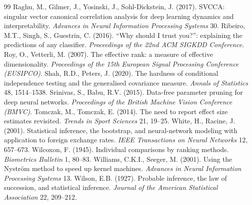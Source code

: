 \documentclass[11pt,a4paper]{article}
\theoremstyle{remark}\newtheorem{remark}{Remark}
\begin{document}
\begin{thebibliography}{99}
 Raghu, M., Gilmer, J., Yosinski, J., Sohl-Dickstein, J. (2017). SVCCA: singular vector canonical correlation analysis for deep learning dynamics and interpretability. \emph{Advances in Neural Information Processing Systems} 30.
 Ribeiro, M.T., Singh, S., Guestrin, C. (2016). ``Why should I trust you?'': explaining the predictions of any classifier. \emph{Proceedings of the 22nd ACM SIGKDD Conference}.
 Roy, O., Vetterli, M. (2007). The effective rank: a measure of effective dimensionality. \emph{Proceedings of the 15th European Signal Processing Conference (EUSIPCO)}.
 Shah, R.D., Peters, J. (2020). The hardness of conditional independence testing and the generalised covariance measure. \emph{Annals of Statistics} 48, 1514--1538.
 Srinivas, S., Babu, R.V. (2015). Data-free parameter pruning for deep neural networks. \emph{Proceedings of the British Machine Vision Conference (BMVC)}.
 Tomczak, M., Tomczak, E. (2014). The need to report effect size estimates revisited. \emph{Trends in Sport Sciences} 21, 19--25.
 White, H., Racine, J. (2001). Statistical inference, the bootstrap, and neural-network modeling with application to foreign exchange rates. \emph{IEEE Transactions on Neural Networks} 12, 657--673.
 Wilcoxon, F. (1945). Individual comparisons by ranking methods. \emph{Biometrics Bulletin} 1, 80--83.
 Williams, C.K.I., Seeger, M. (2001). Using the Nystr\"om method to speed up kernel machines. \emph{Advances in Neural Information Processing Systems} 13.
 Wilson, E.B. (1927). Probable inference, the law of succession, and statistical inference. \emph{Journal of the American Statistical Association} 22, 209--212.
\end{thebibliography}
\end{document}
